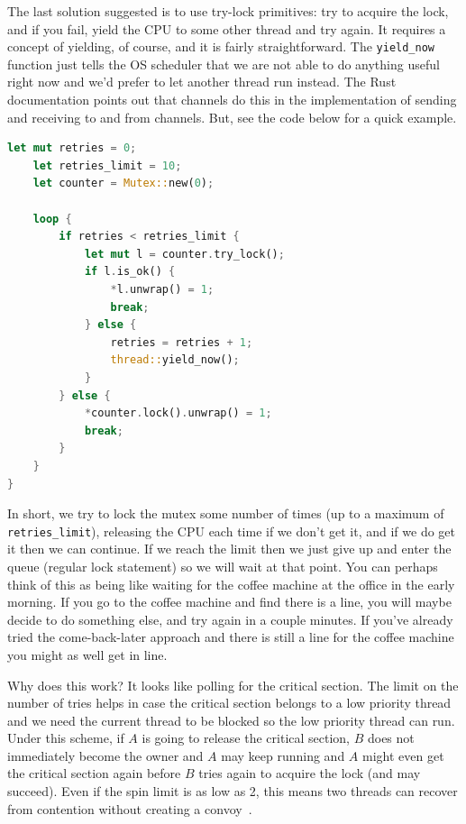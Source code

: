 \documentclass[a4paper]{report}
\begin{document}
The last solution suggested is to use try-lock primitives: try to acquire the lock, and if you fail, yield the CPU to some other thread and try again. It requires a concept of yielding, of course, and it is fairly straightforward. The \texttt{yield\_now} function just tells the OS scheduler that we are not able to do anything useful right now and we'd prefer to let another thread run instead. The Rust documentation points out that channels do this in the implementation of sending and receiving to and from channels. But, see the code below for a quick example.

\begin{lstlisting}[language=Rust]
    let mut retries = 0;
    let retries_limit = 10;
    let counter = Mutex::new(0);

    loop {
        if retries < retries_limit {
            let mut l = counter.try_lock();
            if l.is_ok() {
                *l.unwrap() = 1;
                break;
            } else {
                retries = retries + 1;
                thread::yield_now();
            }
        } else {
            *counter.lock().unwrap() = 1;
            break;
        }
    }
}
\end{lstlisting}

In short, we try to lock the mutex some number of times (up to a maximum of \texttt{retries\_limit}), releasing the CPU each time if we don't get it, and if we do get it then we can continue. If we reach the limit then we just give up and enter the queue (regular lock statement) so we will wait at that point. You can perhaps think of this as being like waiting for the coffee machine at the office in the early morning. If you go to the coffee machine and find there is a line, you will maybe decide to do something else, and try again in a couple minutes. If you've already tried the come-back-later approach and there is still a line for the coffee machine you might as well get in line.

Why does this work? It looks like polling for the critical section. The limit on the number of tries helps in case the critical section belongs to a low priority thread and we need the current thread to be blocked so the low priority thread can run. Under this scheme, if $A$ is going to release the critical section, $B$ does not immediately become the owner and $A$ may keep running and $A$ might even get the critical section again before $B$ tries again to acquire the lock (and may succeed). Even if the spin limit is as low as 2, this means two threads can recover from contention without creating a convoy~\cite{lockconvoys}. 
\end{document}
